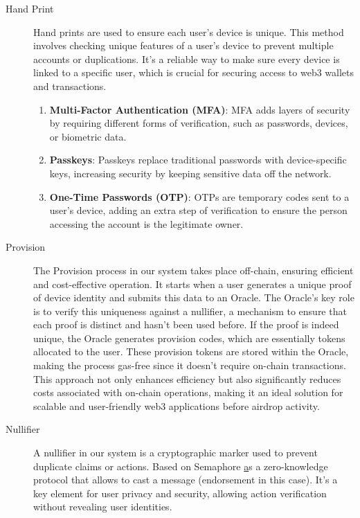\documentclass[12pt,oneside]{article}
\begin{document}
\begin{description}
  \item[Hand Print] 
  Hand prints are used to ensure each user's device is unique. This method involves checking unique features of a user's device to prevent multiple accounts or duplications. It's a reliable way to make sure every device is linked to a specific user, which is crucial for securing access to web3 wallets and transactions. 
  
  \begin{enumerate}
      \item \textbf{Multi-Factor Authentication (MFA)}: MFA adds layers of security by requiring different forms of verification, such as passwords, devices, or biometric data.
      \item \textbf{Passkeys}: Passkeys replace traditional passwords with device-specific keys, increasing security by keeping sensitive data off the network.
      \item \textbf{One-Time Passwords (OTP)}: OTPs are temporary codes sent to a user's device, adding an extra step of verification to ensure the person accessing the account is the legitimate owner.
  \end{enumerate}  

  \item[Provision]
  The Provision process in our system takes place off-chain, ensuring
  efficient and cost-effective operation. It starts when a user generates a unique proof of
  device identity and submits this data to an Oracle. The Oracle's key role is to verify this uniqueness 
  against a nullifier, a mechanism to ensure that each proof is distinct and hasn't been used before. 
  If the proof is indeed unique, the Oracle generates provision codes, which are essentially tokens allocated 
  to the user. These provision tokens are stored within the Oracle, making the process gas-free since it doesn't require
  on-chain transactions. This approach not only enhances efficiency but also significantly reduces costs associated with
  on-chain operations, making it an ideal solution for scalable and user-friendly web3 applications before airdrop activity.

  \item[Nullifier]
  A nullifier in our system is a cryptographic marker used to prevent duplicate claims or actions. 
  Based on Semaphore \href{https://semaphore.pse.dev/} as a zero-knowledge protocol that allows to cast a message (endorsement in this case).
  It's a key element for user privacy and security, allowing action verification without revealing 
  user identities. \cite{semaphore_protocol_github} \cite{fazekas2023semaphore}


\end{description}
\end{document}
